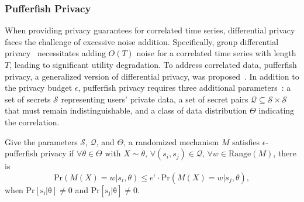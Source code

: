 \subsubsection{Pufferfish Privacy}
When providing privacy guarantees for correlated time series, differential privacy faces the challenge of excessive noise addition. Specifically, group differential privacy~\cite{dwork2014algorithmic} necessitates adding $O(T)$ noise for a  correlated time series with length $T$, leading to significant utility degradation. To address correlated data, pufferfish privacy, a generalized version of differential privacy, was proposed~\cite{kifer2014pufferfish}. In addition to the privacy budget $\epsilon$, pufferfish privacy requires three additional parameters~\cite{song2017pufferfish}: a set of secrets $\mathcal{S}$ representing users' private data, a set of secret pairs $\mathcal{Q}\subseteq \mathcal{S}\times \mathcal{S}$ that must remain indistinguishable, and a class of data distribution $\Theta$ indicating the correlation.
\begin{definition}
Give the parameters $\mathcal{S}$, $\mathcal{Q}$, and $\Theta$, a randomized mechanism $M$ satisfies $\epsilon$-pufferfish privacy if $\forall \theta\in \Theta $ with $X\sim \theta$, $\forall (s_i, s_j)\in \mathcal{Q}$, $\forall w\in \text{Range}(M)$, there is
\begin{equation}\nonumber
 \mathrm{Pr}(M(X)=w|s_i, \theta)\le e^\epsilon\cdot \mathrm{Pr}(M(X)=w|s_j, \theta),
\end{equation}
when $\mathrm{Pr[s_i|\theta]\ne 0}$ and $\mathrm{Pr[s_j|\theta]\ne 0}$.
\end{definition}





